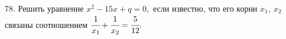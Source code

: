 78. Решить уравнение $x^2-15x+q=0,$ если известно, что его корни $x_1,\ x_2$ связаны соотношением $\cfrac{1}{x_1}+\cfrac{1}{x_2}=\cfrac{5}{12}.$\\
